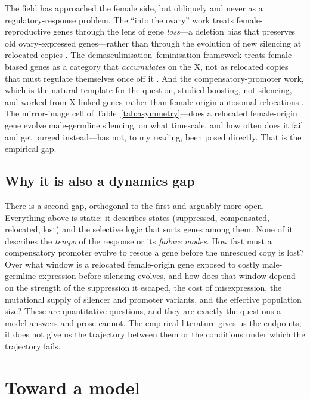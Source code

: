 \documentclass[11pt,a4paper]{article}
\begin{document}
The field has approached the female side, but obliquely and never as a regulatory-response problem. The ``into the ovary'' work treats female-reproductive genes through the lens of gene \emph{loss}---a deletion bias that preserves old ovary-expressed genes---rather than through the evolution of new silencing at relocated copies \citep{assis2019}. The demasculinisation--feminisation framework treats female-biased genes as a category that \emph{accumulates} on the X, not as relocated copies that must regulate themselves once off it \citep{zhang2010,connallon2011}. And the compensatory-promoter work, which is the natural template for the question, studied boosting, not silencing, and worked from X-linked genes rather than female-origin autosomal relocations \citep{landeen2016}. The mirror-image cell of Table~\ref{tab:asymmetry}---does a relocated female-origin gene evolve male-germline silencing, on what timescale, and how often does it fail and get purged instead---has not, to my reading, been posed directly. That is the empirical gap.

\subsection{Why it is also a dynamics gap}

There is a second gap, orthogonal to the first and arguably more open. Everything above is static: it describes states (suppressed, compensated, relocated, lost) and the selective logic that sorts genes among them. None of it describes the \emph{tempo} of the response or its \emph{failure modes}. How fast must a compensatory promoter evolve to rescue a gene before the unrescued copy is lost? Over what window is a relocated female-origin gene exposed to costly male-germline expression before silencing evolves, and how does that window depend on the strength of the suppression it escaped, the cost of misexpression, the mutational supply of silencer and promoter variants, and the effective population size? These are quantitative questions, and they are exactly the questions a model answers and prose cannot. The empirical literature gives us the endpoints; it does not give us the trajectory between them or the conditions under which the trajectory fails.

\section{Toward a model}
\end{document}
